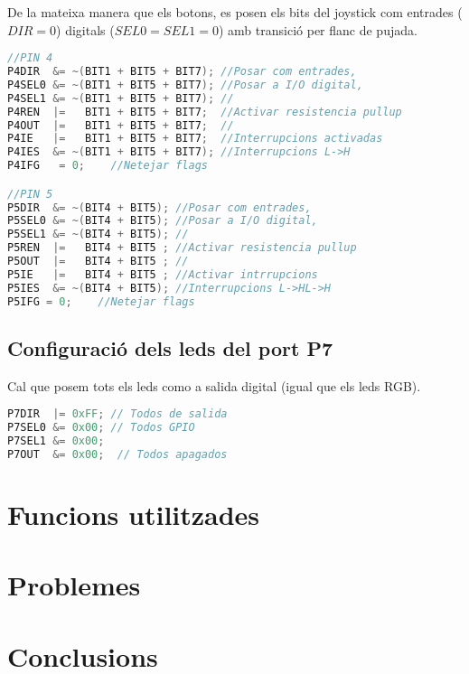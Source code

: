 \documentclass[12pt,a4paper]{article}
\begin{document}
De la mateixa manera que els botons, es posen els bits del joystick com entrades ($DIR = 0$) digitals ($SEL0 = SEL1 = 0$) amb transició per flanc de pujada.
\begin{lstlisting}[language=C++]
//PIN 4
P4DIR  &= ~(BIT1 + BIT5 + BIT7); //Posar com entrades,
P4SEL0 &= ~(BIT1 + BIT5 + BIT7); //Posar a I/O digital,
P4SEL1 &= ~(BIT1 + BIT5 + BIT7); //
P4REN  |=   BIT1 + BIT5 + BIT7;  //Activar resistencia pullup
P4OUT  |=   BIT1 + BIT5 + BIT7;  //
P4IE   |=   BIT1 + BIT5 + BIT7;  //Interrupcions activadas
P4IES  &= ~(BIT1 + BIT5 + BIT7); //Interrupcions L->H
P4IFG   = 0;    //Netejar flags

//PIN 5
P5DIR  &= ~(BIT4 + BIT5); //Posar com entrades,
P5SEL0 &= ~(BIT4 + BIT5); //Posar a I/O digital,
P5SEL1 &= ~(BIT4 + BIT5); //
P5REN  |=   BIT4 + BIT5 ; //Activar resistencia pullup
P5OUT  |=   BIT4 + BIT5 ; //
P5IE   |=   BIT4 + BIT5 ; //Activar intrrupcions
P5IES  &= ~(BIT4 + BIT5); //Interrupcions L->HL->H
P5IFG = 0;    //Netejar flags
\end{lstlisting}

\subsection{Configuració dels leds del port P7}

Cal que posem tots els leds como a salida digital (igual que els leds RGB).

\begin{lstlisting}[language=C++]
P7DIR  |= 0xFF; // Todos de salida
P7SEL0 &= 0x00; // Todos GPIO
P7SEL1 &= 0x00;
P7OUT  &= 0x00;  // Todos apagados
\end{lstlisting}

\section{Funcions utilitzades}

\section{Problemes}

\section{Conclusions}
\end{document}
